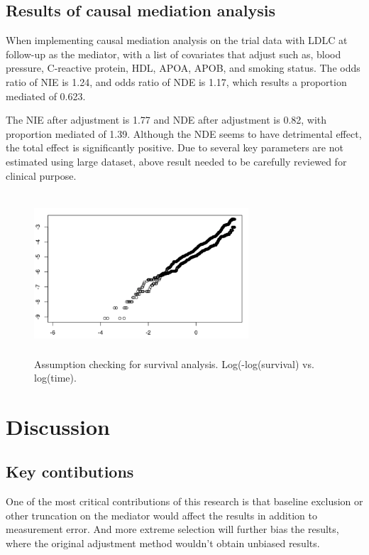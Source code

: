 \documentclass{article}
\begin{document}
\subsection{Results of causal mediation analysis}

When implementing causal mediation analysis on the trial data with LDLC at follow-up as the mediator, with a list of covariates that adjust such as, blood pressure, C-reactive protein, HDL, APOA, APOB, and smoking status. The odds ratio of  NIE is 1.24, and odds ratio of NDE is 1.17, which results a proportion mediated of 0.623.

The NIE after adjustment is 1.77 and NDE after adjustment is 0.82, with proportion mediated of 1.39.  Although the NDE seems to have detrimental effect, the total effect is significantly positive. Due to several key parameters are not estimated using large dataset, above result needed to be carefully reviewed for clinical purpose. 


\begin{figure}[h]
\centering
\includegraphics[width = 8cm,height = 6cm]{figure-12.png}
\caption{Assumption checking for survival analysis.  Log(-log(survival) vs. log(time). }
\label{fig12}
\end{figure}




\pagebreak
\clearpage


\section{Discussion}

\subsection{Key contibutions}

One of the most critical contributions of this research is that baseline exclusion or other truncation on the mediator would affect the results in addition to measurement error. And more extreme selection will further bias the results, where the original adjustment method wouldn’t obtain unbiased results. 
\end{document}
